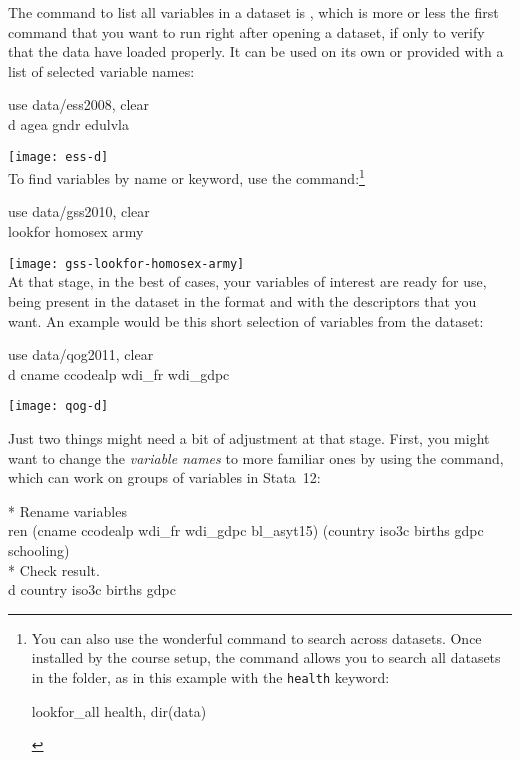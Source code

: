  The command to list all variables in a dataset is , which is more or less the first command that you want to run right after opening a dataset, if only to verify that the data have loaded properly. It can be used on its own or provided with a list of selected variable names:\\[1em]

\begin{docspec}
	use data/ess2008, clear\\
	d agea gndr edulvla
\end{docspec}

\texttt{[image: ess-d]}\\[1em]

To find variables by name or keyword, use the  command:\footnote{You can also use the wonderful  command to search across datasets. Once installed by the course setup, the command allows you to search all datasets in the \data folder, as in this example with the \texttt{health} keyword:%
		\begin{docspec}
			lookfor\_all health, dir(data)
		\end{docspec}}\\[1em]

\begin{docspec}
	use data/gss2010, clear\\
	lookfor homosex army
\end{docspec}

\texttt{[image: gss-lookfor-homosex-army]}\\[1em]

At that stage, in the best of cases, your variables of interest are ready for use, being present in the dataset in the format and with the descriptors that you want. An example would be this short selection of variables from the \QOG dataset:

	\begin{docspec}
		use data/qog2011, clear\\
		d cname ccodealp wdi\_fr wdi\_gdpc
	\end{docspec}
	
	\texttt{[image: qog-d]}

Just two things might need a bit of adjustment at that stage. First, you might want to change the \emph{variable names} to more familiar ones by using the  command, which can work on groups of variables in Stata~12:

	\begin{docspec}
		* Rename variables\\
		ren (cname ccodealp wdi\_fr wdi\_gdpc bl\_asyt15) (country iso3c births gdpc schooling)\\
		* Check result.\\
		d country iso3c births gdpc
	\end{docspec}

